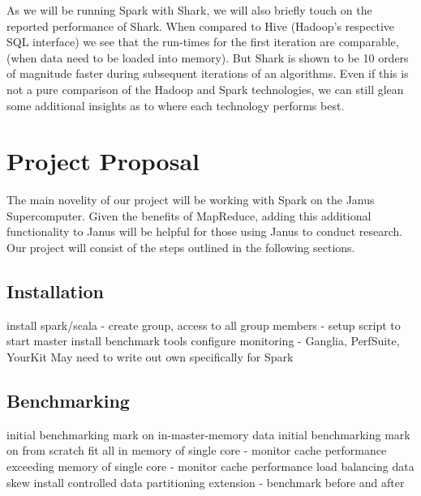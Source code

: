 \documentclass{article}
\begin{document}




As we will be running Spark with Shark, we will also briefly touch on the
reported performance of Shark. When compared to Hive (Hadoop's respective
SQL interface) we see that the run-times for the first iteration are comparable,
(when data need to be loaded into memory). But Shark is shown to be 10 orders
of magnitude faster during subsequent iterations of an algorithms\citep{engle}.
Even if this is not a pure comparison of the Hadoop and Spark technologies, we
can still glean some additional insights as to where each technology performs
best.


\section*{Project Proposal}
The main novelity of our project will be working with Spark on the Janus
Supercomputer. Given the benefits of MapReduce, adding this additional
functionality to Janus will be helpful for those using Janus to conduct
research. Our project will consist of the steps outlined in the
following sections.

\subsection*{Installation}
install spark/scala
- create group, access to all group members
- setup script to start master
install benchmark tools configure
    monitoring - Ganglia, PerfSuite, YourKit
    May need to write out own specifically for Spark

\subsection*{Benchmarking}
initial benchmarking mark on in-master-memory data
initial benchmarking mark on from scratch
fit all in memory of single core
- monitor cache performance
exceeding memory of single core
- monitor cache performance
load balancing data skew
install controlled data partitioning extension
- benchmark before and after
\end{document}
